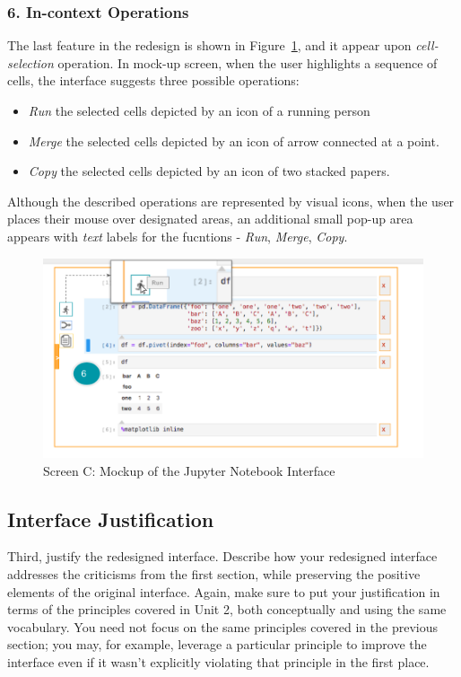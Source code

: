 \documentclass[12pt,letterpaper]{article}
\begin{document}
\subsubsection*{6. In-context Operations}
The last feature in the redesign is shown in Figure~\ref{fig::6}, and it appear upon \textit{cell-selection} operation. In mock-up screen, when the user highlights a sequence of cells, the interface suggests three possible operations:

\begin{itemize}
    \item \textit{Run} the selected cells depicted by an icon of a running person
    \item \textit{Merge} the selected cells depicted by an icon of arrow connected at a point.
    \item \textit{Copy} the selected cells depicted by an icon of two stacked papers.
\end{itemize}

Although the described operations are represented by visual icons, when the user places their mouse over designated areas, an additional small pop-up area appears with \textit{text} labels for the fucntions - \textit{Run}, \textit{Merge}, \textit{Copy}.


\begin{figure}[h]
\centering
\includegraphics[scale=.6]{figures/project-principles/jupyter_mock_screen_c.png}
\caption{Screen C: Mockup of the Jupyter Notebook Interface}
\label{fig::6}
\end{figure}


\subsection*{Interface Justification}
Third, justify the redesigned interface. Describe how your redesigned interface addresses the criticisms from the first section, while preserving the positive elements of the original interface. Again, make sure to put your justification in terms of the principles covered in Unit 2, both conceptually and using the same vocabulary. You need not focus on the same principles covered in the previous section; you may, for example, leverage a particular principle to improve the interface even if it wasn’t explicitly violating that principle in the first place.


 

\end{document}
